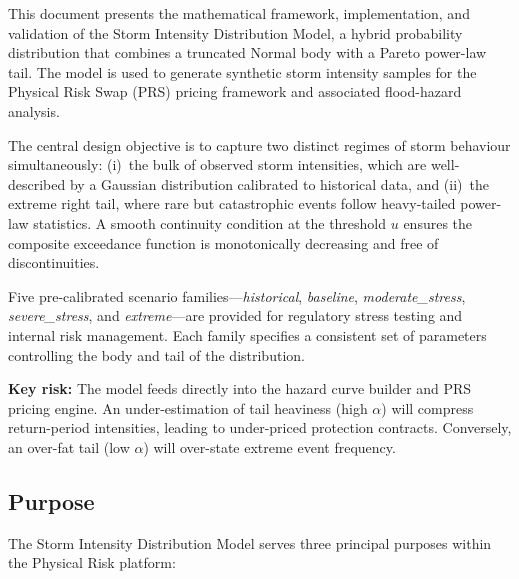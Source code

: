 \documentclass[11pt,a4paper]{article}
\begin{document}
\mkmtitlepage
\mkmlegalpage
\tableofcontents
\clearpage

\mkmexecsummary

This document presents the mathematical framework, implementation, and validation of the
Storm Intensity Distribution Model, a hybrid probability distribution that combines a
truncated Normal body with a Pareto power-law tail. The model is used to generate
synthetic storm intensity samples for the Physical Risk Swap (PRS) pricing framework
and associated flood-hazard analysis.

The central design objective is to capture two distinct regimes of storm behaviour
simultaneously: (i)~the bulk of observed storm intensities, which are well-described by
a Gaussian distribution calibrated to historical data, and (ii)~the extreme right tail,
where rare but catastrophic events follow heavy-tailed power-law statistics. A smooth
continuity condition at the threshold $u$ ensures the composite exceedance function is
monotonically decreasing and free of discontinuities.

Five pre-calibrated scenario families---\emph{historical}, \emph{baseline},
\emph{moderate\_stress}, \emph{severe\_stress}, and \emph{extreme}---are provided for
regulatory stress testing and internal risk management. Each family specifies a consistent
set of parameters controlling the body and tail of the distribution.

\textbf{Key risk:} The model feeds directly into the hazard curve builder and PRS
pricing engine. An under-estimation of tail heaviness (high $\alpha$) will compress
return-period intensities, leading to under-priced protection contracts. Conversely,
an over-fat tail (low $\alpha$) will over-state extreme event frequency.

\mkmpurpose

\subsection{Purpose}

The Storm Intensity Distribution Model serves three principal purposes within the
Physical Risk platform:
\end{document}
